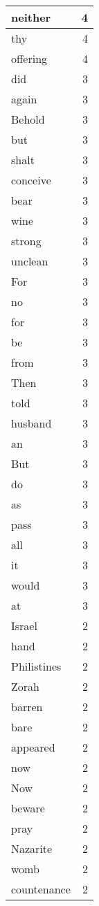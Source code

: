 \begin{center}
\begin{longtable}{l|r}
neither & 4\\ \hline 
thy & 4\\ \hline 
offering & 4\\ \hline 
did & 3\\ \hline 
again & 3\\ \hline 
Behold & 3\\ \hline 
but & 3\\ \hline 
shalt & 3\\ \hline 
conceive & 3\\ \hline 
bear & 3\\ \hline 
wine & 3\\ \hline 
strong & 3\\ \hline 
unclean & 3\\ \hline 
For & 3\\ \hline 
no & 3\\ \hline 
for & 3\\ \hline 
be & 3\\ \hline 
from & 3\\ \hline 
Then & 3\\ \hline 
told & 3\\ \hline 
husband & 3\\ \hline 
an & 3\\ \hline 
But & 3\\ \hline 
do & 3\\ \hline 
as & 3\\ \hline 
pass & 3\\ \hline 
all & 3\\ \hline 
it & 3\\ \hline 
would & 3\\ \hline 
at & 3\\ \hline 
Israel & 2\\ \hline 
hand & 2\\ \hline 
Philistines & 2\\ \hline 
Zorah & 2\\ \hline 
barren & 2\\ \hline 
bare & 2\\ \hline 
appeared & 2\\ \hline 
now & 2\\ \hline 
Now & 2\\ \hline 
beware & 2\\ \hline 
pray & 2\\ \hline 
Nazarite & 2\\ \hline 
womb & 2\\ \hline 
countenance & 2\\ \hline 

\end{longtable}
\end{center}
